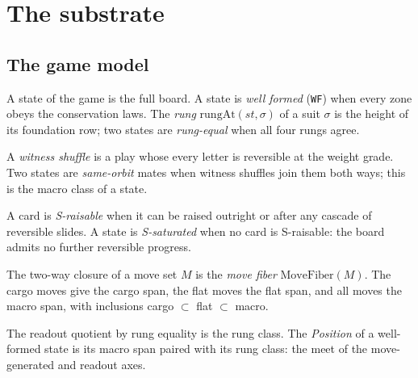 \chapter{The substrate}
\label{chap:substrate}

\section{The game model}

\begin{definition}\label{def:model}
\leanok
A state of the game is the full board.  A state is \emph{well
formed} (\texttt{WF}) when every zone obeys the conservation laws.
The \emph{rung} $\mathrm{rungAt}(st, \sigma)$ of a suit $\sigma$
is the height of its foundation row; two states are
\emph{rung-equal} when all four rungs agree.
\end{definition}

\begin{definition}\label{def:orbit}
\leanok
{}
A \emph{witness shuffle} is a play whose every letter is
reversible at the weight grade.  Two states are \emph{same-orbit}
mates when witness shuffles join them both ways; this is the
macro class of a state.
\end{definition}

\begin{definition}[S-saturation]\label{def:ssaturated}
\leanok
{}
A card is \emph{S-raisable} when it can be raised outright or
after any cascade of reversible slides.  A state is
\emph{S-saturated} when no card is S-raisable: the board admits
no further reversible progress.
\end{definition}

\begin{definition}\label{def:fibers}
\leanok
{}
The two-way closure of a move set $M$ is the \emph{move fiber}
$\mathrm{MoveFiber}(M)$.  The cargo moves give the cargo span,
the flat moves the flat span, and all moves the macro span, with
inclusions cargo $\subset$ flat $\subset$ macro.
\end{definition}

\begin{definition}\label{def:position}
\leanok
{}
The readout quotient by rung equality is the rung class.  The
\emph{Position} of a well-formed state is its macro span paired
with its rung class: the meet of the move-generated and readout
axes.
\end{definition}

